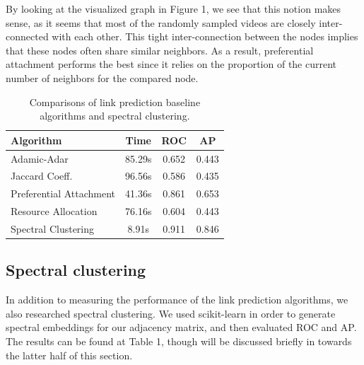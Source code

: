 \documentclass[10pt,twocolumn,letterpaper]{article}
\begin{document}
By looking at the visualized graph in Figure 1, we see that this notion makes sense, as it seems that most of the randomly sampled videos are closely inter-connected with each other. This tight inter-connection between the nodes implies that these nodes often share similar neighbors. As a result, preferential attachment performs the best since it relies on the proportion of the current number of neighbors for the compared node.

\begin{table}
\begin{center}
\begin{tabular}{|l|c|c|c|}
\hline
Algorithm & Time & ROC & AP \\
\hline\hline
Adamic-Adar & 85.29s &  0.652 & 0.443\\
Jaccard Coeff. & 96.56s & 0.586 & 0.435 \\
Preferential Attachment & 41.36s & 0.861 & 0.653 \\
Resource Allocation & 76.16s & 0.604 & 0.443 \\
Spectral Clustering & 8.91s & 0.911 & 0.846 \\
\hline
\end{tabular}
\end{center}
\caption{Comparisons of link prediction baseline algorithms and spectral clustering.}
\label{tab:contributions}
\end{table}





\subsection{Spectral clustering}

In addition to measuring the performance of the link prediction algorithms, we also researched spectral clustering. We used scikit-learn in order to generate spectral embeddings for our adjacency matrix, and then evaluated ROC and AP. The results can be found at Table 1, though will be discussed briefly in towards the latter half of this section.
    
\end{document}
